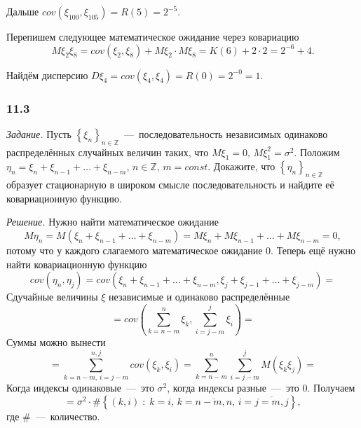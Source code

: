 Дальше $cov \left( \xi_{100}, \xi_{105} \right) = R \left( 5 \right) = 2^{-5}$.

Перепишем следующее математическое ожидание через ковариацию
\begin{equation*}
  M \xi_2 \xi_8 =
  cov \left( \xi_2, \xi_8 \right) + M \xi_2 \cdot M \xi_8 =
  K \left( 6 \right) + 2 \cdot 2 =
  2^{-6} + 4.
\end{equation*}

Найдём дисперсию $D \xi_4 = cov \left( \xi_4, \xi_4 \right) = R \left( 0 \right) = 2^{-0} = 1$.

\subsubsection*{11.3}

\textit{Задание.}
Пусть $ \left\{ \xi_n \right\}_{n \in \mathbb{Z}}$~---~последовательность
независимых одинаково распределённых случайных величин таких,
что $M \xi_1 = 0, \, M \xi_1^2 = \sigma^2$.
Положим $ \eta_n = \xi_n + \xi_{n - 1} + \dotsc + \xi_{n - m}, \, n \in \mathbb{Z}, \, m = const$.
Докажите, что $ \left\{ \eta_n \right\}_{n \in \mathbb{Z}}$
образует стационарную в широком смысле последовательность и найдите её ковариационную функцию.

\textit{Решение.}
Нужно найти математическое ожидание
\begin{equation*}
  M \eta_n =
  M \left( \xi_n + \xi_{n - 1} + \dotsc + \xi_{n - m} \right) =
  M \xi_n + M \xi_{n - 1} + \dotsc + M \xi_{n - m} =
  0,
\end{equation*}
потому что у каждого слагаемого математическое ожидание 0.
Теперь ещё нужно найти ковариационную функцию
\begin{equation*}
  cov \left( \eta_n, \eta_j \right) =
  cov \left(
    \xi_n + \xi_{n - 1} + \dotsc + \xi_{n - m}, \xi_j + \xi_{j - 1} + \dotsc + \xi_{j - m}
  \right) =
\end{equation*}
Сдучайные величины $ \xi $ независимые и одинаково распределённые
\begin{equation*}
  = cov \left( \sum \limits_{k = n - m}^n \xi_k, \sum \limits_{i = j - m}^j \xi_i \right) =
\end{equation*}
Суммы можно вынести
\begin{equation*}
  = \sum \limits_{k = n - m, \, i = j - m}^{n, j} cov \left( \xi_k, \xi_i \right) =
  \sum \limits_{k = n - m}^n \sum \limits_{i = j - m}^j M \left( \xi_k \xi_j \right) =
\end{equation*}
Когда индексы одинаковые~---~это $ \sigma^2$, когда индексы разные~---~это 0.
Получаем
\begin{equation*}
  = \sigma^2 \cdot \# \left\{
    \left( k, i \right) \; : \; k = i, \, k = \overline{n - m, n}, \, i = \overline{j = m, j}
  \right\},
\end{equation*}
где $ \# $~---~количество.


